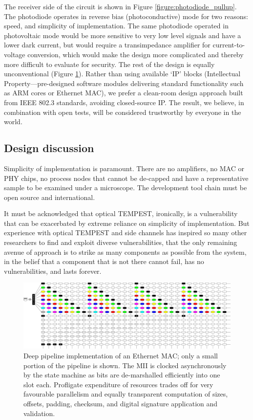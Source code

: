 \documentclass[conference]{IEEEtran}
\begin{document}
The receiver side of the circuit is shown in Figure
\ref{figure:photodiode_pullup}. The photodiode operates in reverse bias
(photoconductive) mode for two reasons: speed, and simplicity of
implementation. The same photodiode operated in photovoltaic mode would be
more sensitive to very low level signals and have a lower dark current, but
would require a transimpedance amplifier for current-to-voltage conversion,
which would make the design more complicated and thereby more difficult to
evaluate for security. The rest of the design is equally unconventional
(Figure \ref{figure:deep_pipeline}). Rather than using available `IP' blocks
(Intellectual Property---pre-designed software modules delivering standard
functionality such as ARM cores or Ethernet MAC), we prefer a clean-room
design approach built from IEEE 802.3 standards, avoiding closed-source IP.
The result, we believe, in combination with open tests, will be considered
trustworthy by everyone in the world.

\subsection{Design discussion}

Simplicity of implementation is paramount. There are no amplifiers, no MAC
or PHY chips, no process nodes that cannot be de-capped and have a
representative sample to be examined under a microscope. The development tool
chain must be open source and international.

It must be acknowledged that optical TEMPEST, ironically, is a vulnerability
that can be exacerbated by extreme reliance on simplicity of implementation.
But experience with optical TEMPEST and side channels has inspired so many
other researchers to find and exploit diverse vulnerabilities, that the only
remaining avenue of approach is to strike as many components as possible from
the system, in the belief that a component that is not there cannot fail, has
no vulnerabilities, and lasts forever.

\begin{figure}[!t]
    \centering
	\includegraphics[width=\textwidth]{graphics/deep_pipeline.png}
	\caption{Deep pipeline implementation of an Ethernet MAC; only a small
        portion of the pipeline is shown. The MII is clocked asynchronously
        by the state machine as bits are de-marshalled efficiently into one
        slot each. Profligate expenditure of resources trades off for very
        favourable parallelism and equally transparent computation of sizes,
        offsets, padding, checksum, and digital signature application and
        validation.}
	\label{figure:deep_pipeline}
\end{figure}
\end{document}
